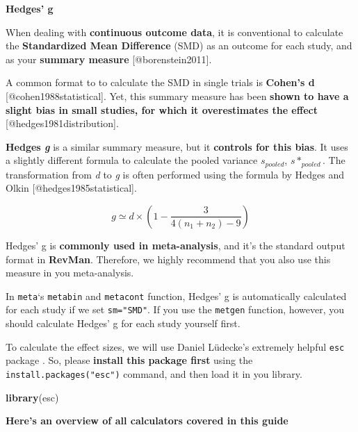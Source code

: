 \documentclass[]{book}
\newenvironment{Shaded}{\begin{snugshade}}{\end{snugshade}}
\newcommand{\KeywordTok}[1]{\textcolor[rgb]{0.13,0.29,0.53}{\textbf{#1}}}
\newcommand{\NormalTok}[1]{#1}
\theoremstyle{definition}
\theoremstyle{definition}
\theoremstyle{definition}
\theoremstyle{remark}
\begin{document}
\begin{rmdinfo}
\textbf{Hedges' g}

When dealing with \textbf{continuous outcome data}, it is conventional
to calculate the \textbf{Standardized Mean Difference} (SMD) as an
outcome for each study, and as your \textbf{summary measure}
{[}@borenstein2011{]}.

A common format to to calculate the SMD in single trials is
\textbf{Cohen's d} {[}@cohen1988statistical{]}. Yet, this summary
measure has been \textbf{shown to have a slight bias in small studies,
for which it overestimates the effect} {[}@hedges1981distribution{]}.

\textbf{Hedges \emph{g} } is a similar summary measure, but it
\textbf{controls for this bias}. It uses a slightly different formula to
calculate the pooled variance \(s_{pooled}\), \(s*_{pooled}\). The
transformation from \emph{d} to \emph{g} is often performed using the
formula by Hedges and Olkin {[}@hedges1985statistical{]}.

\[g \simeq d\times(1-\frac{3}{4(n_1+n_2)-9}) \]
\end{rmdinfo}

\begin{rmdachtung}
Hedges' g is \textbf{commonly used in meta-analysis}, and it's the
standard output format in \textbf{RevMan}. Therefore, we highly
recommend that you also use this measure in you meta-analysis.

In \texttt{meta}`s \texttt{metabin} and \texttt{metacont} function,
Hedges' g is automatically calculated for each study if we set
\texttt{sm="SMD"}. If you use the \texttt{metgen} function, however, you
should calculate Hedges' g for each study yourself first.
\end{rmdachtung}

To calculate the effect sizes, we will use Daniel Lüdecke's extremely
helpful \texttt{esc} package \citep{esc}. So, please \textbf{install
this package first} using the \texttt{install.packages("esc")} command,
and then load it in you library.

\begin{Shaded}
\begin{Highlighting}[]
\KeywordTok{library}\NormalTok{(esc)}
\end{Highlighting}
\end{Shaded}

\textbf{Here's an overview of all calculators covered in this guide}
\end{document}
